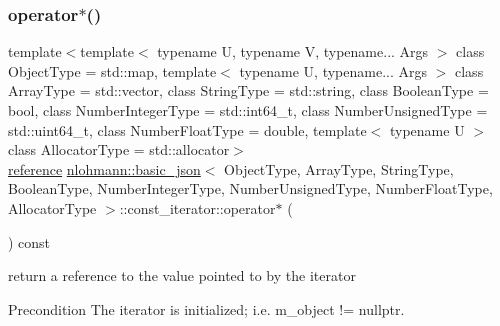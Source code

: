\subsubsection{\texorpdfstring{operator$\ast$()}{operator*()}}
{\footnotesize\ttfamily template$<$template$<$ typename U, typename V, typename... Args $>$ class Object\+Type = std\+::map, template$<$ typename U, typename... Args $>$ class Array\+Type = std\+::vector, class String\+Type  = std\+::string, class Boolean\+Type  = bool, class Number\+Integer\+Type  = std\+::int64\+\_\+t, class Number\+Unsigned\+Type  = std\+::uint64\+\_\+t, class Number\+Float\+Type  = double, template$<$ typename U $>$ class Allocator\+Type = std\+::allocator$>$ \\
\hyperlink{classnlohmann_1_1basic__json_1_1const__iterator_aefd248cac6493eed1e6ff53ba6a63eb2}{reference} \hyperlink{classnlohmann_1_1basic__json}{nlohmann\+::basic\+\_\+json}$<$ Object\+Type, Array\+Type, String\+Type, Boolean\+Type, Number\+Integer\+Type, Number\+Unsigned\+Type, Number\+Float\+Type, Allocator\+Type $>$\+::const\+\_\+iterator\+::operator$\ast$ (\begin{DoxyParamCaption}{ }\end{DoxyParamCaption}) const\hspace{0.3cm}{\ttfamily [inline]}}



return a reference to the value pointed to by the iterator 

\begin{DoxyPrecond}{Precondition}
The iterator is initialized; i.\+e. {\ttfamily m\+\_\+object != nullptr}. 
\end{DoxyPrecond}
\mbox{\label{classnlohmann_1_1basic__json_1_1const__iterator_a7a80257f2303210b0a5d056fc0b30b40}} 
